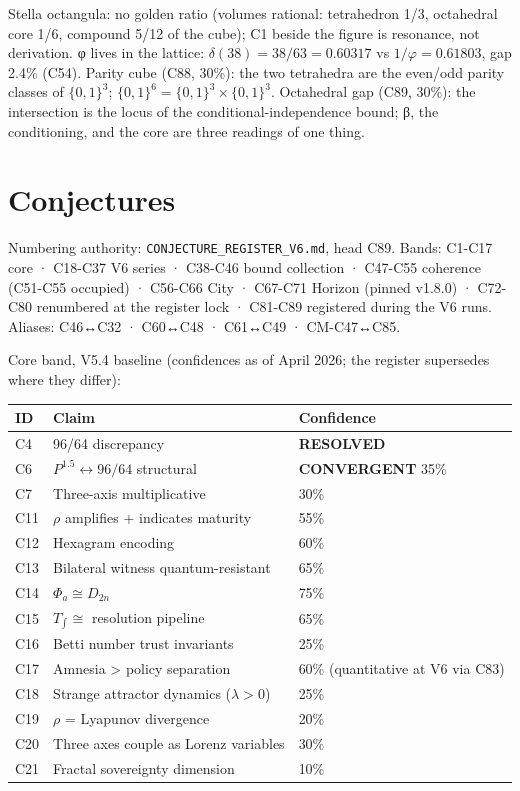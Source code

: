\documentclass[
]{article}
\newcounter{none} %
\begin{document}
Stella octangula: no golden ratio (volumes rational: tetrahedron 1/3,
octahedral core 1/6, compound 5/12 of the cube); C1 beside the figure is
resonance, not derivation. φ lives in the lattice:
\(\delta(38) = 38/63 = 0.60317\) vs \(1/\varphi = 0.61803\), gap 2.4\%
(C54). Parity cube (C88, 30\%): the two tetrahedra are the even/odd
parity classes of \(\{0,1\}^3\);
\(\{0,1\}^6 = \{0,1\}^3 \times \{0,1\}^3\). Octahedral gap (C89, 30\%):
the intersection is the locus of the conditional-independence bound; β,
the conditioning, and the core are three readings of one thing.

\section{Conjectures}\label{conjectures}

Numbering authority: \texttt{CONJECTURE\_REGISTER\_V6.md}, head C89.
Bands: C1-C17 core · C18-C37 V6 series · C38-C46 bound collection ·
C47-C55 coherence (C51-C55 occupied) · C56-C66 City · C67-C71 Horizon
(pinned v1.8.0) · C72-C80 renumbered at the register lock · C81-C89
registered during the V6 runs. Aliases: C46↔C32 · C60↔C48 · C61↔C49 ·
CM-C47↔C85.

Core band, V5.4 baseline (confidences as of April 2026; the register
supersedes where they differ):

{\def\LTcaptype{none} %
\begin{longtable}[]{@{}lll@{}}
\toprule\noalign{}
ID & Claim & Confidence \\
\midrule\noalign{}
\endhead
\bottomrule\noalign{}
\endlastfoot
C4 & 96/64 discrepancy & \textbf{RESOLVED} \\
C6 & \(P^{1.5} \leftrightarrow 96/64\) structural & \textbf{CONVERGENT}
35\% \\
C7 & Three-axis multiplicative & 30\% \\
C11 & \(\rho\) amplifies + indicates maturity & 55\% \\
C12 & Hexagram encoding & 60\% \\
C13 & Bilateral witness quantum-resistant & 65\% \\
C14 & \(\Phi_a \cong D_{2n}\) & 75\% \\
C15 & \(T_{\!\int} \cong\) resolution pipeline & 65\% \\
C16 & Betti number trust invariants & 25\% \\
C17 & Amnesia \textgreater{} policy separation & 60\% (quantitative at
V6 via C83) \\
C18 & Strange attractor dynamics (\(\lambda > 0\)) & 25\% \\
C19 & \(\rho\) = Lyapunov divergence & 20\% \\
C20 & Three axes couple as Lorenz variables & 30\% \\
C21 & Fractal sovereignty dimension & 10\% \\
\end{longtable}
}
\end{document}
